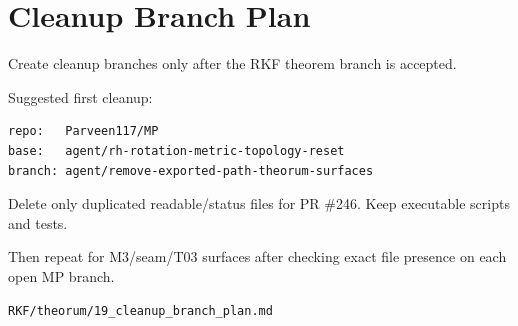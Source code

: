 \hypertarget{cleanup-branch-plan}{%
\chapter{Cleanup Branch Plan}\label{cleanup-branch-plan}}

Create cleanup branches only after the RKF theorem branch is accepted.

Suggested first cleanup:

\begin{verbatim}
repo:   Parveen117/MP
base:   agent/rh-rotation-metric-topology-reset
branch: agent/remove-exported-path-theorum-surfaces
\end{verbatim}

Delete only duplicated readable/status files for PR \#246. Keep executable scripts and tests.

Then repeat for M3/seam/T03 surfaces after checking exact file presence on each open MP branch.

\begin{flushright}\small\texttt{RKF/theorum/19\_cleanup\_branch\_plan.md}\end{flushright}
